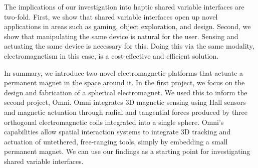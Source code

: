 The implications of our investigation into haptic shared variable interfaces are two-fold. First, we show that shared variable interfaces open up novel applications in areas such as gaming, object exploration, and design. Second, we show that manipulating the same device is natural for the user. Sensing and actuating the same device is necessary for this. Doing this via the same modality, electromagnetism in this case, is a cost-effective and efficient solution.

In summary, we introduce two novel electromagnetic platforms that actuate a permanent magnet in the space around it. In the first project, we focus on the design and fabrication of a spherical electromagnet. We used this to inform the second project, Omni. Omni integrates 3D magnetic sensing using Hall sensors and magnetic actuation through radial and tangential forces produced by three orthogonal electromagnetic coils integrated into a single sphere. Omni’s capabilities allow spatial interaction systems to integrate 3D tracking and actuation of untethered, free-ranging tools, simply by embedding a small permanent magnet. We can use our findings as a starting point for investigating shared variable interfaces. 